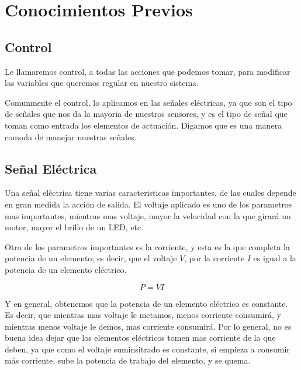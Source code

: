 \section{Conocimientos Previos}


	\subsection{Control}

		Le llamaremos control, a todas las acciones que podemos tomar, para modificar las variables que queremos regular en nuestro sistema.

		Comunmente el control, lo aplicamos en las señales eléctricas, ya que son el tipo de señales que nos da la mayoria de nuestros sensores, y es el tipo de señal que toman como entrada los elementos de actuación. Digamos que es una manera comoda de manejar nuestras señales.


	\subsection{Señal Eléctrica}

		Una señal eléctrica tiene varias caracteristicas importantes, de las cuales depende en gran medida la acción de salida. El voltaje aplicado es uno de los parametros mas importantes, mientras mas voltaje, mayor la velocidad con la que girará un motor, mayor el brillo de un LED, etc.

		Otro de los parametros importantes es la corriente, y esta es la que completa la potencia de un elemento; es decir, que el voltaje $V$, por la corriente $I$ es igual a la potencia de un elemento eléctrico.

		\begin{equation}
			P = V I
		\end{equation}

		Y en general, obtenemos que la potencia de un elemento eléctrico es constante. Es decir, que mientras mas voltaje le metamos, menos corriente consumirá, y mientras menos voltaje le demos, mas corriente consumirá. Por lo general, no es buena idea dejar que los elementos eléctricos tomen mas corriente de la que deben, ya que como el voltaje suminsitrado es constante, si empieza a consumir más corriente, sube la potencia de trabajo del elemento, y se quema.


